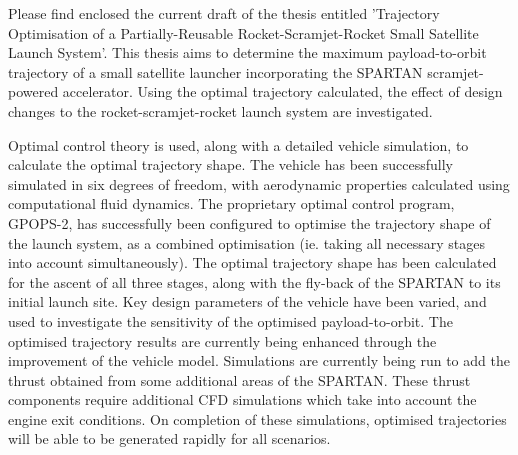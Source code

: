 
\thispagestyle{empty}

Please find enclosed the current draft of the thesis entitled 'Trajectory Optimisation of a Partially-Reusable Rocket-Scramjet-Rocket Small Satellite Launch System'. This thesis aims to determine the maximum payload-to-orbit trajectory of a small satellite launcher incorporating the SPARTAN scramjet-powered accelerator. Using the optimal trajectory calculated, the effect of design changes to the rocket-scramjet-rocket launch system are investigated.

Optimal control theory is used, along with a detailed vehicle simulation, to calculate the optimal trajectory shape. The vehicle has been successfully simulated in six degrees of freedom, with aerodynamic properties calculated using computational fluid dynamics. 
 The proprietary optimal control program, GPOPS-2, has successfully been configured to optimise the trajectory shape of the launch system, as a combined optimisation (ie. taking all necessary stages into account simultaneously). The optimal trajectory shape has been calculated for the ascent of all three stages, along with the fly-back of the SPARTAN to its initial launch site. Key design parameters of the vehicle have been varied, and used to investigate the sensitivity of the optimised payload-to-orbit. The optimised trajectory results are currently being enhanced through the improvement of the vehicle model. Simulations are currently being run to add the thrust obtained from some additional areas of the SPARTAN. These thrust components require additional CFD simulations which take into account the engine exit conditions. On completion of these simulations, optimised trajectories will be able to be generated rapidly for all scenarios. 

